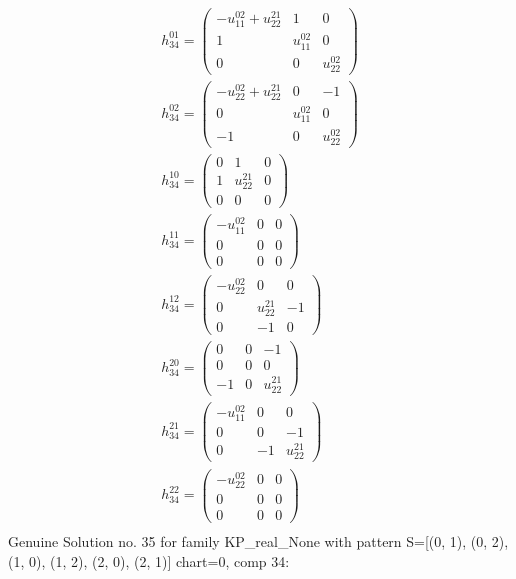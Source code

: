 \documentclass[a4paper, 11pt, twoside, onecolumn]{article}
\begin{document}
\begin{landscape}
\begin{gather*}
	 h_{34}^{01}=\begin{pmatrix}- u^{02}_{11} + u^{21}_{22} & 1 & 0\\1 & u^{02}_{11} & 0\\0 & 0 & u^{02}_{22}\end{pmatrix}\\ 
	 h_{34}^{02}=\begin{pmatrix}- u^{02}_{22} + u^{21}_{22} & 0 & -1\\0 & u^{02}_{11} & 0\\-1 & 0 & u^{02}_{22}\end{pmatrix}\\ 
	 h_{34}^{10}=\begin{pmatrix}0 & 1 & 0\\1 & u^{21}_{22} & 0\\0 & 0 & 0\end{pmatrix}\\ 
	 h_{34}^{11}=\begin{pmatrix}- u^{02}_{11} & 0 & 0\\0 & 0 & 0\\0 & 0 & 0\end{pmatrix}\\ 
	 h_{34}^{12}=\begin{pmatrix}- u^{02}_{22} & 0 & 0\\0 & u^{21}_{22} & -1\\0 & -1 & 0\end{pmatrix}\\ 
	 h_{34}^{20}=\begin{pmatrix}0 & 0 & -1\\0 & 0 & 0\\-1 & 0 & u^{21}_{22}\end{pmatrix}\\ 
	 h_{34}^{21}=\begin{pmatrix}- u^{02}_{11} & 0 & 0\\0 & 0 & -1\\0 & -1 & u^{21}_{22}\end{pmatrix}\\ 
	 h_{34}^{22}=\begin{pmatrix}- u^{02}_{22} & 0 & 0\\0 & 0 & 0\\0 & 0 & 0\end{pmatrix}\\ 
\end{gather*} 
Genuine Solution no. 35 for family KP_real_None with pattern S=[(0, 1), (0, 2), (1, 0), (1, 2), (2, 0), (2, 1)] chart=0, comp 34: 
\begin{gather*} 

\end{gather*}
\end{landscape}
\end{document}
